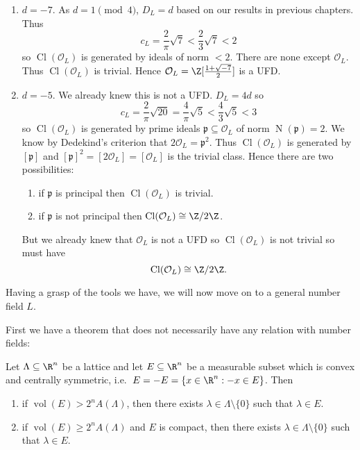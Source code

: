 \documentclass[a4paper]{article}
\renewcommand*{\O}{\mathcal{O}}
\DeclareMathOperator{\n}{N}
\DeclareMathOperator{\Cl}{Cl}%
\DeclareMathOperator{\vol}{vol}
\begin{document}
\begin{eg}\leavevmode
  \begin{enumerate}
  \item \(d = -7\). As \(d = 1 \pmod 4\), \(D_L = d\) based on our results in previous chapters. Thus
    \[
      c_L = \frac{2}{\pi} \sqrt 7 < \frac{2}{3} \sqrt 7 < 2
    \]
    so \(\Cl(\O_L)\) is generated by ideals of norm \(< 2\). There are none except \(\O_L\). Thus \(\Cl(\O_L)\) is trivial. Hence \(\O_L = \Z[\frac{1 + \sqrt{-7}}{2}]\) is a UFD.
  \item \(d = -5\). We already knew this is not a UFD. \(D_L = 4d\) so
    \[
      c_L = \frac{2}{\pi}\sqrt{20} = \frac{4}{\pi}\sqrt 5 < \frac{4}{3} \sqrt 5 < 3
    \]
    so \(\Cl(\O_L)\) is generated by prime ideals \(\mathfrak p \subseteq \O_L\) of norm \(\n(\mathfrak p) = 2\). We know by Dedekind's criterion that \(2\O_L = \mathfrak p^2\). Thus \(\Cl(\O_L)\) is generated by \([\mathfrak p]\) and \([\mathfrak p]^2 = [2\O_L] = [\O_L]\) is the trivial class. Hence there are two possibilities:
    \begin{enumerate}
    \item if \(\mathfrak p\) is principal then \(\Cl(\O_L)\) is trivial.
    \item if \(\mathfrak p\) is not principal then \(\Cl(\O_L) \cong \Z/2\Z\).
    \end{enumerate}
    But we already knew that \(\O_L\) is not a UFD so \(\Cl(\O_L)\) is not trivial so must have
    \[
      \Cl(\O_L) \cong \Z/2\Z.
    \]
  \end{enumerate}
\end{eg}

Having a grasp of the tools we have, we will now move on to a general number field \(L\).

First we have a theorem that does not necessarily have any relation with number fields:

\begin{theorem}[Minkowski]
  \label{thm:Minkowski}
  Let \(\Lambda \subseteq \R^n\) be a lattice and let \(E \subseteq \R^n\) be a measurable subset which is convex and centrally symmetric, i.e.\ \(E = -E = \{x \in \R^n: -x \in E\}\). Then
  \begin{enumerate}
  \item if \(\vol(E) > 2^n A(\Lambda)\), then there exists \(\lambda \in \Lambda \setminus \{0\}\) such that \(\lambda \in E\).
  \item if \(\vol(E) \geq 2^n A(\Lambda)\) and \(E\) is compact, then there exists \(\lambda \in \Lambda \setminus \{0\}\) such that \(\lambda \in E\).
  \end{enumerate}
\end{theorem}
\end{document}
